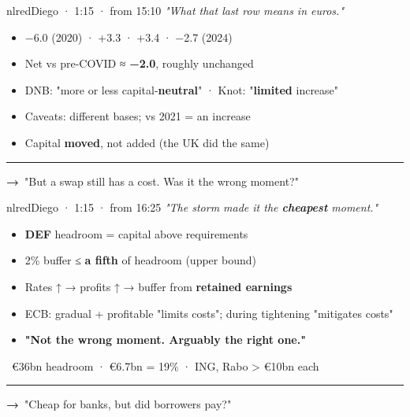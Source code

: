 \documentclass[10pt]{article}
\begin{document}
\begin{card}{nlred}{\hfill{\normalsize\mdseries Diego · 1:15 · from 15:10}}
{\large\itshape "What that last row means in euros."}\par\smallskip
\begin{itemize}[label=\textcolor{nlred}{\textbullet}]\item −6.0 (2020) · +3.3 · +3.4 · −2.7 (2024)\item Net vs pre-COVID ≈ \textbf{−2.0}, roughly unchanged\item DNB: "more or less capital-\textbf{neutral}" · Knot: "\textbf{limited} increase"\item Caveats: different bases; vs 2021 = an increase\item Capital \textbf{moved}, not added (the UK did the same)\end{itemize}
\vfill\textcolor{grey}{\rule{\linewidth}{0.3pt}}\par{\bfseries\color{nlred}→}\ "But a swap still has a cost. Was it the wrong moment?"
\end{card}
\hfill
\begin{card}{nlred}{\hfill{\normalsize\mdseries Diego · 1:15 · from 16:25}}
{\large\itshape "The storm made it the \textbf{cheapest} moment."}\par\smallskip
\begin{itemize}[label=\textcolor{nlred}{\textbullet}]\item \textcolor{gold!80!black}{\textbf{DEF}} headroom = capital above requirements\item 2\% buffer ≤ \textbf{a fifth} of headroom (upper bound)\item Rates ↑ → profits ↑ → buffer from \textbf{retained earnings}\item ECB: gradual + profitable "limits costs"; during tightening "mitigates costs"\item \textbf{"Not the wrong moment. Arguably the right one."}\end{itemize}
\smallskip{\color{nlred}\textbf{\#}}\ €36bn headroom · €6.7bn = 19\% · ING, Rabo > €10bn each\par
\vfill\textcolor{grey}{\rule{\linewidth}{0.3pt}}\par{\bfseries\color{nlred}→}\ "Cheap for banks, but did borrowers pay?"
\end{card}

\newpage
\end{document}
